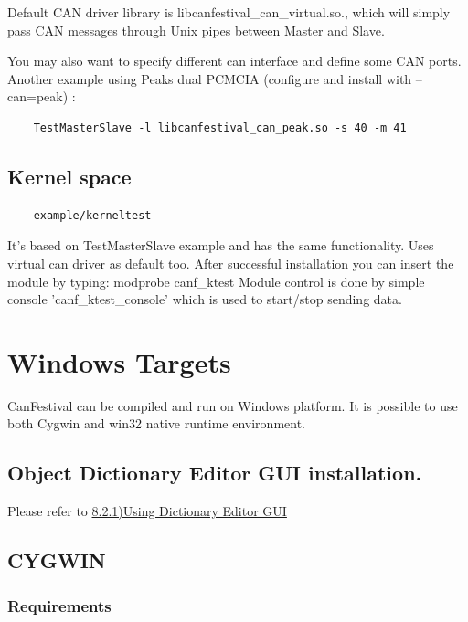 \documentclass[12pt,english,a4paper]{book}
\begin{document}
Default CAN driver library is libcanfestival\_can\_virtual.so., which
will simply pass CAN messages through Unix pipes between Master and
Slave.

You may also want to specify different can interface and define some
CAN ports. Another example using Peak{\textquotesingle}s dual PCMCIA
(configure and install with --can=peak) :


\begin{verbatim}
	TestMasterSlave -l libcanfestival_can_peak.so -s 40 -m 41
\end{verbatim}


\subsection{Kernel space}


\begin{verbatim}
	example/kerneltest
\end{verbatim}


It's based on TestMasterSlave example
and has the same functionality. Uses virtual can driver as default
too. After successful installation you can insert the module by typing:
modprobe canf\_ktest Module control is done by simple console 'canf\_ktest\_console'
which is used to start/stop sending data.


\section{Windows Targets}

CanFestival can be compiled and run on Windows platform. It is possible
to use both Cygwin and win32 native runtime environment.

\subsection{Object Dictionary Editor GUI installation.}

Please refer to \hyperlink{a821UsingDictionaryEditorGUIoutline}{8.2.1)Using
Dictionary Editor GUI}

\subsection{CYGWIN}

\subsubsection{Requirements}
\end{document}
